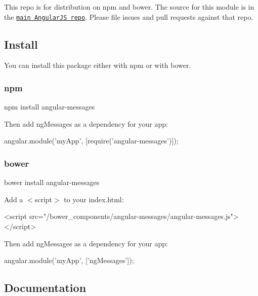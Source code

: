 This repo is for distribution on {\ttfamily npm} and {\ttfamily bower}. The source for this module is in the \href{https://github.com/angular/angular.js/tree/master/src/ngMessages}{\tt main Angular\+JS repo}. Please file issues and pull requests against that repo.

\subsection*{Install}

You can install this package either with {\ttfamily npm} or with {\ttfamily bower}.

\subsubsection*{npm}


\begin{DoxyCode}
npm install angular-messages
\end{DoxyCode}


Then add {\ttfamily ng\+Messages} as a dependency for your app\+:


\begin{DoxyCode}
angular.module('myApp', [require('angular-messages')]);
\end{DoxyCode}


\subsubsection*{bower}


\begin{DoxyCode}
bower install angular-messages
\end{DoxyCode}


Add a {\ttfamily $<$script$>$} to your {\ttfamily index.\+html}\+:


\begin{DoxyCode}
<script src="/bower\_components/angular-messages/angular-messages.js"></script>
\end{DoxyCode}


Then add {\ttfamily ng\+Messages} as a dependency for your app\+:


\begin{DoxyCode}
angular.module('myApp', ['ngMessages']);
\end{DoxyCode}


\subsection*{Documentation}

